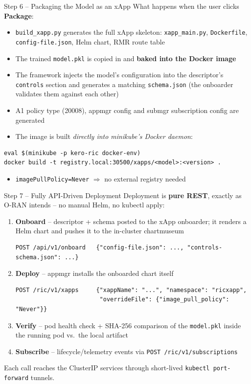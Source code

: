 \documentclass[aspectratio=169]{beamer}
\begin{document}
\begin{frame}[fragile]{Step 6 -- Packaging the Model as an xApp}
  What happens when the user clicks \textbf{Package}:
  \begin{itemize}
    \item \texttt{build\_xapp.py} generates the full xApp skeleton:
      \texttt{xapp\_main.py}, \texttt{Dockerfile}, \texttt{config-file.json},
      Helm chart, RMR route table
    \item The trained \texttt{model.pkl} is copied in and \textbf{baked into the Docker image}
    \item The framework injects the model's configuration into the descriptor's
      \texttt{controls} section and generates a matching \texttt{schema.json}
      (the onboarder validates them against each other)
    \item A1 policy type (20008), appmgr config and submgr subscription config are generated
    \item The image is built \emph{directly into minikube's Docker daemon}:
  \end{itemize}
\begin{lstlisting}
eval $(minikube -p kero-ric docker-env)
docker build -t registry.local:30500/xapps/<model>:<version> .
\end{lstlisting}
  \begin{itemize}
    \item \texttt{imagePullPolicy=Never} $\Rightarrow$ no external registry needed
  \end{itemize}
\end{frame}

\begin{frame}[fragile]{Step 7 -- Fully API-Driven Deployment}
  Deployment is \textbf{pure REST}, exactly as O-RAN intends -- no manual Helm, no kubectl apply:
  \begin{enumerate}
    \item \textbf{Onboard} -- descriptor + schema posted to the xApp onboarder;
      it renders a Helm chart and pushes it to the in-cluster chartmuseum
\begin{lstlisting}
POST /api/v1/onboard   {"config-file.json": ..., "controls-schema.json": ...}
\end{lstlisting}
    \item \textbf{Deploy} -- appmgr installs the onboarded chart itself
\begin{lstlisting}
POST /ric/v1/xapps     {"xappName": "...", "namespace": "ricxapp",
                        "overrideFile": {"image_pull_policy": "Never"}}
\end{lstlisting}
    \item \textbf{Verify} -- pod health check + SHA-256 comparison of the
      \texttt{model.pkl} inside the running pod vs.\ the local artifact
    \item \textbf{Subscribe} -- lifecycle/telemetry events via
      \texttt{POST /ric/v1/subscriptions}
  \end{enumerate}
  Each call reaches the ClusterIP services through short-lived \texttt{kubectl port-forward} tunnels.
\end{frame}
\end{document}
